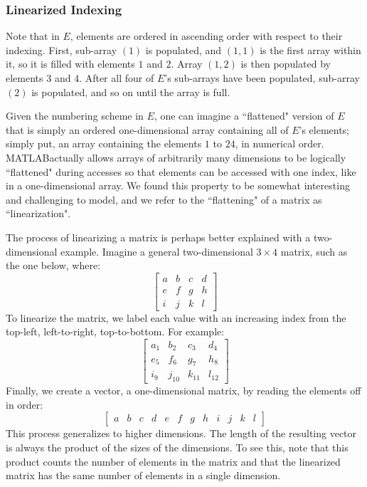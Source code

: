 \documentclass[11pt,conference]{IEEEtran}
\newcommand{\matlab}{MATLAB}
\theoremstyle{plain} %
\theoremstyle{definition}
\theoremstyle{remark}
\begin{document}
\subsubsection{Linearized Indexing} \label{linearizedindexing}
Note that in $E$, elements are ordered in ascending order with respect to their indexing. First, sub-array $(1)$ is populated, and $(1, 1)$ is the first array within it, so it is filled with elements $1$ and $2$. Array $(1, 2)$ is then populated by elements $3$ and $4$. After all four of \textbf{$E$}'s sub-arrays have been populated, sub-array $(2)$ is populated, and so on until the array is full.

Given the numbering scheme in $E$, one can imagine a ``flattened" version of $E$ that is simply an ordered one-dimensional array containing all of $E$'s elements; simply put, an array containing the elements $1$ to $24$, in numerical order. \matlab\@ actually allows arrays of arbitrarily many dimensions to be logically ``flattened" during accesses so that elements can be accessed with one index, like in a one-dimensional array. We found this property to be somewhat interesting and challenging to model, and we refer to the ``flattening" of a matrix as ``linearization". 

The process of linearizing a matrix is perhaps
better explained with a two-dimensional example. Imagine a general two-dimensional $3 \times 4$ matrix, such as the one below, where:
\begin{equation*}
    \begin{bmatrix}
        a & b & c & d \\
        e & f & g & h \\
        i & j & k & l
    \end{bmatrix}
\end{equation*}
To linearize the matrix, we label each value with an increasing index from the
top-left, left-to-right, top-to-bottom. For example:
\begin{equation*}
    \begin{bmatrix}
        a_1 & b_2 & c_3 & d_4 \\
        e_5 & f_6 & g_7 & h_8 \\
        i_9 & j_{10} & k_{11} & l_{12}
    \end{bmatrix}
\end{equation*}
Finally, we create a vector, a one-dimensional matrix, by reading the elements
off in order:
\setcounter{MaxMatrixCols}{20}
\begin{equation*}
    \begin{bmatrix}
        a & b & c & d & e & f & g & h & i & j & k & l
    \end{bmatrix}
\end{equation*}
This process generalizes to higher dimensions. The length of the resulting
vector is always the product of the sizes of the dimensions. To see this, note
that this product counts the number of elements in the matrix and that the
linearized matrix has the same number of elements in a single dimension.
\end{document}
